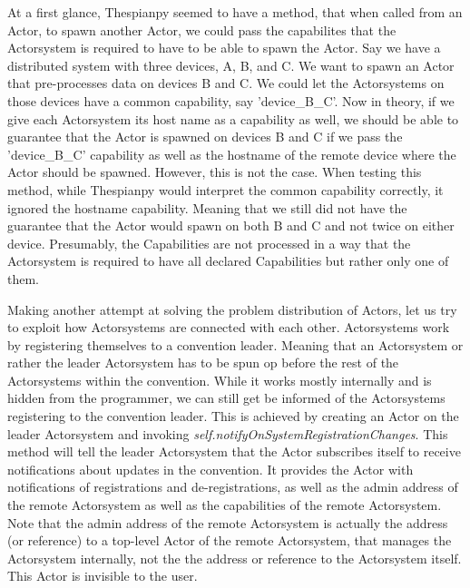 \documentclass[a4paper]{article}
\begin{document}
At a first glance, Thespianpy seemed to have a method, that when called from an Actor, to spawn another Actor, we could pass the capabilites that the Actorsystem is required to have to be able to spawn the Actor. Say we have a distributed system with three devices, A, B, and C. We want to spawn an Actor that pre-processes data on devices B and C. We could let the Actorsystems on those devices have a common capability, say 'device\_B\_C'. Now in theory, if we give each Actorsystem its host name as a capability as well, we should be able to guarantee that the Actor is spawned on devices B and C if we pass the 'device\_B\_C' capability as well as the hostname of the remote device where the Actor should be spawned. However, this is not the case. When testing this method, while Thespianpy would interpret the common capability correctly, it ignored the hostname capability. Meaning that we still did not have the guarantee that the Actor would spawn on both B and C and not twice on either device. Presumably, the Capabilities are not processed in a way that the Actorsystem is required to have all declared Capabilities but rather only one of them.

Making another attempt at solving the problem distribution of Actors, let us try to exploit how Actorsystems are connected with each other. Actorsystems work by registering themselves to a convention leader. Meaning that an Actorsystem or rather the leader Actorsystem has to be spun op before the rest of the Actorsystems within the convention. While it works mostly internally and is hidden from the programmer, we can still get be informed of the Actorsystems registering to the convention leader. This is achieved by creating an Actor on the leader Actorsystem and invoking \textit{self.notifyOnSystemRegistrationChanges}. This method will tell the leader Actorsystem that the Actor subscribes itself to receive notifications about updates in the convention. It provides the Actor with notifications of registrations and de-registrations, as well as the admin address of the remote Actorsystem as well as the capabilities of the remote Actorsystem. Note that the admin address of the remote Actorsystem is actually the address (or reference) to a top-level Actor of the remote Actorsystem, that manages the Actorsystem internally, not the the address or reference to the Actorsystem itself. This Actor is invisible to the user.
\end{document}
